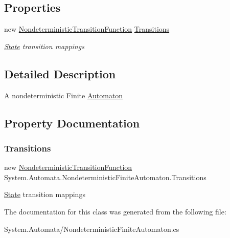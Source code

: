 \subsection*{Properties}
\begin{DoxyCompactItemize}
\item 
new \mbox{\hyperlink{class_system_1_1_automata_1_1_nondeterministic_transition_function}{Nondeterministic\+Transition\+Function}} \mbox{\hyperlink{class_system_1_1_automata_1_1_nondeterministic_finite_automaton_ab34f2411b1591e0eb87cfde9671f4c4a}{Transitions}}
\begin{DoxyCompactList}\small\item\em \mbox{\hyperlink{class_system_1_1_automata_1_1_state}{State}} transition mappings \end{DoxyCompactList}\end{DoxyCompactItemize}


\subsection{Detailed Description}
A nondeterministic Finite \mbox{\hyperlink{class_system_1_1_automata_1_1_automaton}{Automaton}} 



\subsection{Property Documentation}
\mbox{\label{class_system_1_1_automata_1_1_nondeterministic_finite_automaton_ab34f2411b1591e0eb87cfde9671f4c4a}} 
\subsubsection{\texorpdfstring{Transitions}{Transitions}}
{\footnotesize\ttfamily new \mbox{\hyperlink{class_system_1_1_automata_1_1_nondeterministic_transition_function}{Nondeterministic\+Transition\+Function}} System.\+Automata.\+Nondeterministic\+Finite\+Automaton.\+Transitions\hspace{0.3cm}{\ttfamily [get]}}



\mbox{\hyperlink{class_system_1_1_automata_1_1_state}{State}} transition mappings 



The documentation for this class was generated from the following file\+:\begin{DoxyCompactItemize}
\item 
System.\+Automata/Nondeterministic\+Finite\+Automaton.\+cs\end{DoxyCompactItemize}
